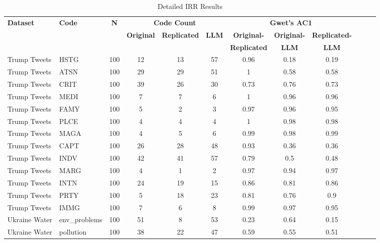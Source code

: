 \documentclass{article}
\begin{document}
\begin{longtable}{@{}llcccccccccc@{}}
\caption{Detailed IRR Results}\\
\toprule
\multirow{3}{*}{\textbf{Dataset}} &
  \multirow{3}{*}{\textbf{Code}} &
  \multirow{3}{*}{\textbf{N}} &
  \multicolumn{3}{c}{\textbf{Code Count}} &
  \multicolumn{3}{c}{\textbf{Gwet's AC1}} & \\* \cmidrule(l){4-12} 
 &
   &
   &
  \multirow{2}{*}{\textbf{Original}} &
  \multirow{2}{*}{\textbf{Replicated}} &
  \multirow{2}{*}{\textbf{LLM}} &
  \textbf{Original-} &
  \textbf{Original-} &
  \textbf{Replicated-} & \\
 &
   &
   &
   &
   &
   &
  \textbf{Replicated} &
  \textbf{LLM} &
  \textbf{LLM} &
 \\* \midrule
\endfirsthead
%
\endhead
%
Trump   Tweets      & HSTG          & 100 & 12 & 13 & 57 & 0.96 & 0.18 & 0.19 \\[1mm]
Trump   Tweets      & ATSN          & 100 & 29 & 29 & 51 & 1    & 0.58 & 0.58 \\[1mm]
Trump   Tweets      & CRIT          & 100 & 39 & 26 & 30 & 0.73 & 0.76 & 0.73 \\[1mm]
Trump Tweets        & MEDI          & 100 & 7  & 7  & 6  & 1    & 0.96 & 0.96 \\[1mm]
Trump   Tweets      & FAMY          & 100 & 5  & 2  & 3  & 0.97 & 0.96 & 0.95 \\[1mm]
Trump   Tweets      & PLCE          & 100 & 4  & 4  & 4  & 1    & 0.98 & 0.98 \\[1mm]
Trump   Tweets      & MAGA          & 100 & 4  & 5  & 6  & 0.99 & 0.98 & 0.99 \\[1mm]
Trump   Tweets      & CAPT          & 100 & 26 & 28 & 48 & 0.93 & 0.36 & 0.36 \\[1mm]
Trump   Tweets      & INDV          & 100 & 42 & 41 & 57 & 0.79 & 0.5  & 0.48 \\[1mm]
Trump   Tweets      & MARG          & 100 & 4  & 1  & 2  & 0.97 & 0.94 & 0.97 \\[1mm]
Trump   Tweets      & INTN          & 100 & 24 & 19 & 15 & 0.86 & 0.81 & 0.86 \\[1mm]
Trump   Tweets      & PRTY          & 100 & 5  & 18 & 23 & 0.81 & 0.76 & 0.9  \\[1mm]
Trump   Tweets      & IMMG          & 100 & 7  & 6  & 8  & 0.99 & 0.97 & 0.95 \\[1mm]
Ukraine   Water     & env\_problems & 100 & 51 & 8  & 53 & 0.23 & 0.64 & 0.15 \\[1mm]
Ukraine   Water     & pollution     & 100 & 38 & 22 & 47 & 0.59 & 0.55 & 0.51 \\[1mm]

\end{longtable}
\end{document}

